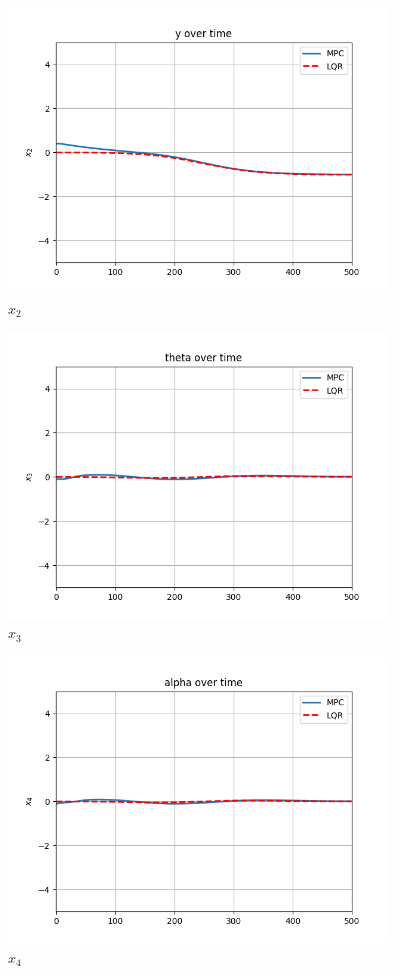 \begin{figure}[H]
\centering
\includegraphics[width=0.9\textwidth]{pictures/mpc2.png}
\caption{$x_2$}
\label{fig:mpc2}
\end{figure}

\begin{figure}[H]
\centering
\includegraphics[width=0.9\textwidth]{pictures/mpc3.png}
\caption{$x_3$}
\label{fig:mpc3}
\end{figure}

\begin{figure}[H]
\centering
\includegraphics[width=0.9\textwidth]{pictures/mpc4.png}
\caption{$x_4$}
\label{fig:mpc4}
\end{figure}

